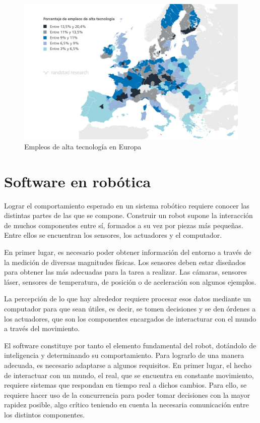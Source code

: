 \documentclass[12pt,spanish,chapterprefix, numbers=noenddot]{book}
\numberwithin{equation}{section}
\numberwithin{figure}{section}
\begin{document}
\begin{figure}[hbt!]
\centering
\includegraphics[width=12cm]{Figs/empleosTecEur.jpg}
\par
\caption{\label{fig:empleoEur}Empleos de alta tecnología en Europa}
\end{figure}

\section{Software en robótica}

Lograr el comportamiento esperado en un sistema robótico requiere conocer las distintas partes de las que se compone. Construir un robot supone la interacción de muchos componentes entre sí, formados a su vez por piezas más pequeñas. Entre ellos se encuentran los sensores, los actuadores y el computador. 

En primer lugar, es necesario poder obtener información del entorno a través de la medición de diversas magnitudes físicas. Los sensores deben estar diseñados para obtener las más adecuadas para la tarea a realizar. Las cámaras, sensores láser, sensores de temperatura, de posición o de aceleración son algunos ejemplos. 

La percepción de lo que hay alrededor requiere procesar esos datos mediante un computador para que sean útiles, es decir, se tomen decisiones y se den órdenes a los actuadores, que son los componentes encargados de interacturar con el mundo a través del movimiento. 

El software constituye por tanto el elemento fundamental del robot, dotándolo de inteligencia y determinando su comportamiento. Para lograrlo de una manera adecuada, es necesario adaptarse a algunos requisitos. En primer lugar, el hecho de interactuar con un mundo, el real, que se encuentra en constante movimiento, requiere sistemas que respondan en tiempo real a dichos cambios. Para ello, se requiere hacer uso de la concurrencia para poder tomar decisiones con la mayor rapidez posible, algo crítico teniendo en cuenta la necesaria comunicación entre los distintos componentes. 
\end{document}
